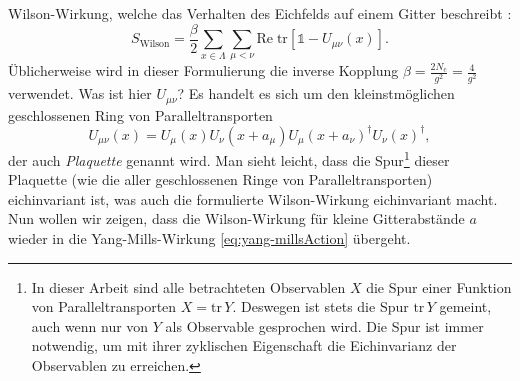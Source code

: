 Wilson-Wirkung, welche das Verhalten des Eichfelds auf einem Gitter beschreibt
\cite{urbachCPscript}:
\begin{equation} \label{eq:wilsonAction}
    S_\text{Wilson} = \frac{\beta}{2} \sum_{x \in \Lambda} \sum_{\mu < \nu}
    \text{Re} \; \text{tr} \left[\mathds{1} - U_{\mu \nu}(x) \right].
\end{equation}
Üblicherweise wird in dieser Formulierung die inverse Kopplung
$\beta = \frac{2 N_\text{c}}{g^2} = \frac{4}{g^2}$ verwendet. Was ist hier 
$U_{\mu \nu}$? Es handelt es sich um den kleinstmöglichen geschlossenen Ring von
Paralleltransporten \cite{urbachCPscript}
\[
    U_{\mu \nu}(x) = U_\mu(x) U_\nu(x + a_\mu) U_\mu(x + a_\nu)^\dag U_\nu(x)^\dag,
\]
der auch \emph{Plaquette} genannt wird. Man sieht leicht, dass die Spur\footnote{In
dieser Arbeit sind alle betrachteten Observablen $X$ die Spur einer Funktion 
von Paralleltransporten $X = \text{tr} \, Y$. Deswegen ist stets die Spur
$\text{tr} \, Y$ gemeint, auch wenn nur von $Y$ als Observable gesprochen wird.
Die Spur ist immer notwendig, um mit ihrer zyklischen Eigenschaft die Eichinvarianz
der Observablen zu erreichen.}
dieser Plaquette (wie die aller geschlossenen Ringe von Paralleltransporten)
eichinvariant ist, was auch die formulierte Wilson-Wirkung eichinvariant macht.
Nun wollen wir zeigen, dass die Wilson-Wirkung für kleine Gitterabstände $a$ wieder
in die Yang-Mills-Wirkung \eqref{eq:yang-millsAction} übergeht.


